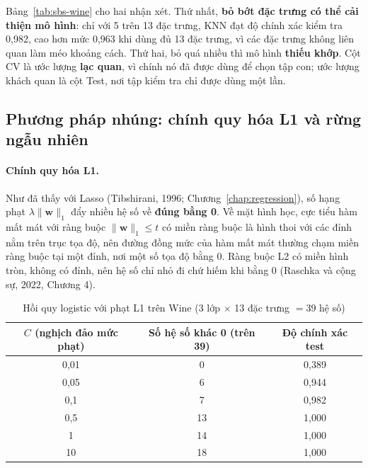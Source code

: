 Bảng~\ref{tab:sbs-wine} cho hai nhận xét. Thứ nhất, \textbf{bỏ bớt đặc trưng có thể cải thiện mô hình}: chỉ với 5 trên 13 đặc trưng, KNN đạt độ chính xác kiểm tra 0,982, cao hơn mức 0,963 khi dùng đủ 13 đặc trưng, vì các đặc trưng không liên quan làm méo khoảng cách. Thứ hai, bỏ quá nhiều thì mô hình \textbf{thiếu khớp}. Cột CV là ước lượng \textbf{lạc quan}, vì chính nó đã được dùng để chọn tập con; ước lượng khách quan là cột Test, nơi tập kiểm tra chỉ được dùng một lần.

\subsection{Phương pháp nhúng: chính quy hóa L1 và rừng ngẫu nhiên}

\paragraph{Chính quy hóa L1.} Như đã thấy với Lasso (Tibshirani, 1996; Chương~\ref{chap:regression}), số hạng phạt $\lambda\|\mathbf{w}\|_1$ đẩy nhiều hệ số về \textbf{đúng bằng 0}. Về mặt hình học, cực tiểu hàm mất mát với ràng buộc $\|\mathbf{w}\|_1 \leq t$ có miền ràng buộc là hình thoi với các đỉnh nằm trên trục tọa độ, nên đường đồng mức của hàm mất mát thường chạm miền ràng buộc tại một đỉnh, nơi một số tọa độ bằng 0. Ràng buộc L2 có miền hình tròn, không có đỉnh, nên hệ số chỉ nhỏ đi chứ hiếm khi bằng 0 (Raschka và cộng sự, 2022, Chương 4).


\begin{table}[H]
\centering
\begin{tabular}{|c|c|c|}
\hline
$C$ (nghịch đảo mức phạt) & \textbf{Số hệ số khác 0 (trên 39)} & \textbf{Độ chính xác test} \\
\hline
0,01 & 0 & 0,389 \\ \hline
0,05 & 6 & 0,944 \\ \hline
0,1 & 7 & 0,982 \\ \hline
0,5 & 13 & 1,000 \\ \hline
1 & 14 & 1,000 \\ \hline
10 & 18 & 1,000 \\ \hline
\end{tabular}
\caption{Hồi quy logistic với phạt L1 trên Wine (3 lớp $\times$ 13 đặc trưng $= 39$ hệ số)}
\label{tab:l1-wine}
\end{table}

